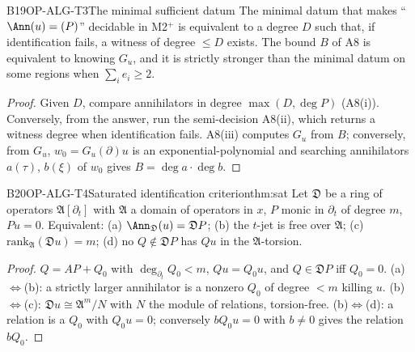 \begin{dimcard}{B19}{OP-ALG-T3}{The minimal sufficient datum}{\pw}{}
The minimal datum that makes ``$\Ann(u)=(P)$'' decidable in M2$^+$ is equivalent to a degree $D$ such that, if identification fails, a witness of degree $\le D$ exists. The bound $B$ of A8 is equivalent to knowing $G_u$, and it is strictly stronger than the minimal datum on some regions when $\sum_ie_i\ge2$.
\end{dimcard}
\begin{proof}
Given $D$, compare annihilators in degree $\max(D,\deg P)$ (A8(i)). Conversely, from the answer, run the semi-decision A8(ii), which returns a witness degree when identification fails.
A8(iii) computes $G_u$ from $B$; conversely, from $G_u$, $w_0=G_u(\partial)u$ is an exponential-polynomial and searching annihilators $a(\tau)$, $b(\xi)$ of $w_0$ gives $B=\deg a\cdot\deg b$.
\end{proof}

\begin{dimcard}{B20}{OP-ALG-T4}{Saturated identification criterion}{\pw}{thm:sat}
Let $\mathfrak D$ be a ring of operators $\mathfrak A[\partial_t]$ with $\mathfrak A$ a domain of operators in $x$, $P$ monic in $\partial_t$ of degree $m$, $Pu=0$. Equivalent: (a) $\Ann_{\mathfrak D}(u)=\mathfrak DP$; (b) the $t$-jet is free over $\mathfrak A$; (c) $\mathrm{rank}_{\mathfrak A}(\mathfrak D u)=m$; (d) no $Q\notin\mathfrak DP$ has $Qu$ in the $\mathfrak A$-torsion.
\end{dimcard}
\begin{proof}
$Q=AP+Q_0$ with $\deg_{\partial_t}Q_0<m$, $Qu=Q_0u$, and $Q\in\mathfrak DP$ iff $Q_0=0$.
(a)$\iff$(b): a strictly larger annihilator is a nonzero $Q_0$ of degree $<m$ killing $u$. (b)$\iff$(c): $\mathfrak Du\cong\mathfrak A^m/N$ with $N$ the module of relations, torsion-free. (b)$\iff$(d): a relation is a $Q_0$ with $Q_0u=0$; conversely $bQ_0u=0$ with $b\ne0$ gives the relation $bQ_0$.
\end{proof}

